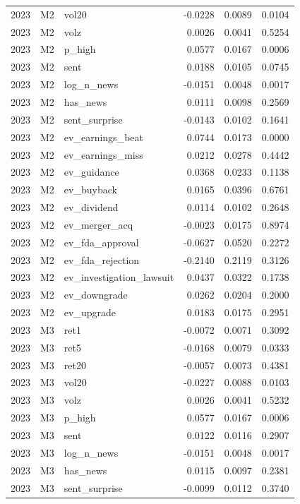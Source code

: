 \begin{tabular}{rllrrr}
2023 & M2 & vol20 & -0.0228 & 0.0089 & 0.0104 \\
2023 & M2 & volz & 0.0026 & 0.0041 & 0.5254 \\
2023 & M2 & p\_high & 0.0577 & 0.0167 & 0.0006 \\
2023 & M2 & sent & 0.0188 & 0.0105 & 0.0745 \\
2023 & M2 & log\_n\_news & -0.0151 & 0.0048 & 0.0017 \\
2023 & M2 & has\_news & 0.0111 & 0.0098 & 0.2569 \\
2023 & M2 & sent\_surprise & -0.0143 & 0.0102 & 0.1641 \\
2023 & M2 & ev\_earnings\_beat & 0.0744 & 0.0173 & 0.0000 \\
2023 & M2 & ev\_earnings\_miss & 0.0212 & 0.0278 & 0.4442 \\
2023 & M2 & ev\_guidance & 0.0368 & 0.0233 & 0.1138 \\
2023 & M2 & ev\_buyback & 0.0165 & 0.0396 & 0.6761 \\
2023 & M2 & ev\_dividend & 0.0114 & 0.0102 & 0.2648 \\
2023 & M2 & ev\_merger\_acq & -0.0023 & 0.0175 & 0.8974 \\
2023 & M2 & ev\_fda\_approval & -0.0627 & 0.0520 & 0.2272 \\
2023 & M2 & ev\_fda\_rejection & -0.2140 & 0.2119 & 0.3126 \\
2023 & M2 & ev\_investigation\_lawsuit & 0.0437 & 0.0322 & 0.1738 \\
2023 & M2 & ev\_downgrade & 0.0262 & 0.0204 & 0.2000 \\
2023 & M2 & ev\_upgrade & 0.0183 & 0.0175 & 0.2951 \\
2023 & M3 & ret1 & -0.0072 & 0.0071 & 0.3092 \\
2023 & M3 & ret5 & -0.0168 & 0.0079 & 0.0333 \\
2023 & M3 & ret20 & -0.0057 & 0.0073 & 0.4381 \\
2023 & M3 & vol20 & -0.0227 & 0.0088 & 0.0103 \\
2023 & M3 & volz & 0.0026 & 0.0041 & 0.5232 \\
2023 & M3 & p\_high & 0.0577 & 0.0167 & 0.0006 \\
2023 & M3 & sent & 0.0122 & 0.0116 & 0.2907 \\
2023 & M3 & log\_n\_news & -0.0151 & 0.0048 & 0.0017 \\
2023 & M3 & has\_news & 0.0115 & 0.0097 & 0.2381 \\
2023 & M3 & sent\_surprise & -0.0099 & 0.0112 & 0.3740 \\

\end{tabular}
